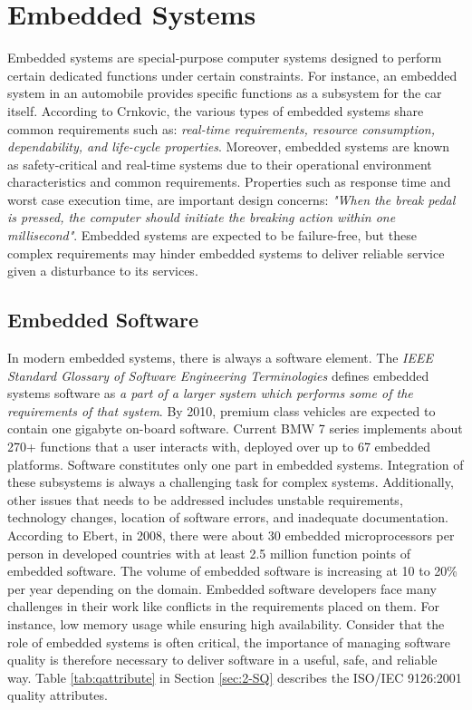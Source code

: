 \section{Embedded Systems}
\label{sec:2-ES}
Embedded systems are special-purpose computer systems designed to perform certain dedicated functions under certain constraints. For instance, an embedded system in an automobile provides specific functions as a subsystem for the car itself\cite{Crnkovic:2005:CSE:1062455.1062631}. According to Crnkovic\cite{crnkovic2004component}, the various types of embedded systems share common requirements such as: \textit{real-time requirements, resource consumption, dependability, and life-cycle properties}. Moreover, embedded systems are known as safety-critical and real-time systems due to their operational environment characteristics and common requirements\cite{563572,Crnkovic:2005:CSE:1062455.1062631}. Properties such as response time and worst case execution time, are important design concerns\cite{4519555}: \textit{"When the break pedal is pressed, the computer should initiate the breaking action within one millisecond"}. Embedded systems are expected to be failure-free\cite{you2013reliability}, but these complex requirements may hinder embedded systems to deliver reliable service given a disturbance to its services\cite{patil2009embedded}. 

\subsection{Embedded Software}
In modern embedded systems, there is always a software element. The \textit{IEEE Standard Glossary of Software Engineering Terminologies} defines embedded systems software as \textit{a part of a larger system which performs some of the requirements of that system}\cite{radatz1990ieee}. By 2010, premium class vehicles are expected to contain one gigabyte on-board software\cite{pretschner2007software,ebert2009embedded}. Current BMW 7 series implements about 270+ functions that a user interacts with, deployed over up to 67 embedded platforms\cite{pretschner2007software}. Software constitutes only one part in embedded systems. Integration of these subsystems is always a challenging task for complex systems\cite{pretschner2007software}. Additionally, other issues that needs to be addressed includes unstable requirements, technology changes, location of software errors, and inadequate documentation\cite{jimenez2013introduction}. According to Ebert, in 2008, there were about 30 embedded microprocessors per person in developed countries with at least 2.5 million function points of embedded software. The volume of embedded software is increasing at 10 to 20\% per year depending on the domain\cite{ebert2009embedded}. Embedded software developers face many challenges in their work like conflicts in the requirements placed on them. For instance, low memory usage while ensuring high availability\cite{vulgarakis2008embedded}. Consider that the role of embedded systems is often critical, the importance of managing software quality is therefore necessary to deliver software in a useful, safe, and reliable way. Table \ref{tab:qattribute} in Section \ref{sec:2-SQ} describes the ISO/IEC 9126:2001 quality attributes.


